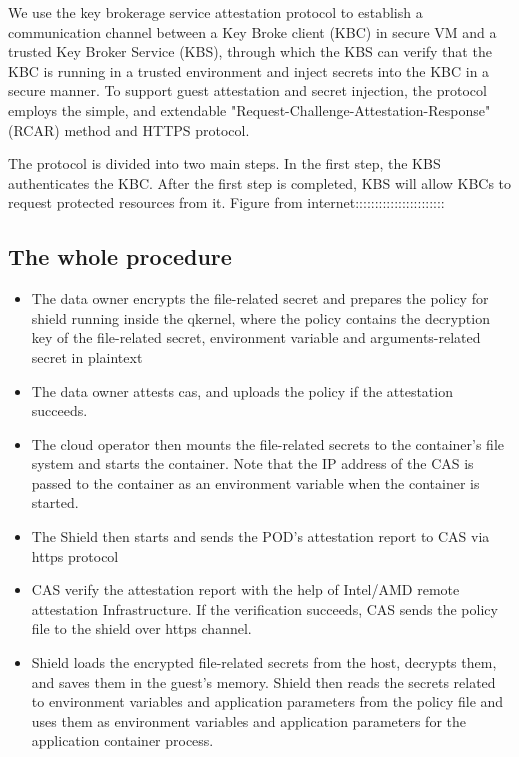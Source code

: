 We use the key brokerage service attestation protocol to establish a communication channel between a Key Broke client (KBC) in secure VM and a trusted Key Broker Service (KBS), 
through which the KBS can verify that the KBC is running in a trusted environment and inject secrets into the KBC in a secure manner.  To support guest attestation and secret injection, the protocol employs the simple, 
and extendable "Request-Challenge-Attestation-Response" (RCAR) method and HTTPS protocol. 

The protocol is divided into two main steps. In the first step, the KBS authenticates the KBC. After the first step is completed, KBS will allow KBCs to request protected resources from it.
Figure from internet:::::::::::::::::::::::

\subsection{The whole procedure}
\begin{itemize}
    \item  The data owner encrypts the file-related secret and prepares the policy for shield running inside the qkernel, where the policy contains the decryption key of the file-related secret, environment variable and arguments-related secret in plaintext
    \item  The data owner attests cas, and uploads the policy if the attestation succeeds.
    \item  The cloud operator then mounts the file-related secrets to the container's file system and starts the container. Note that the IP address of the CAS is passed to the container as an environment variable when the container is started.
    \item  The Shield then starts and sends the POD's attestation report to CAS via https protocol
    \item  CAS verify the attestation report with the help of Intel/AMD remote attestation Infrastructure. If the verification succeeds, CAS sends the policy file to the shield over https channel.
    \item  Shield loads the encrypted file-related secrets from the host, decrypts them, and saves them in the guest's memory. Shield then reads the secrets related to environment variables and application parameters from the policy file and uses them as environment variables and application parameters for the application container process.
\end{itemize}


